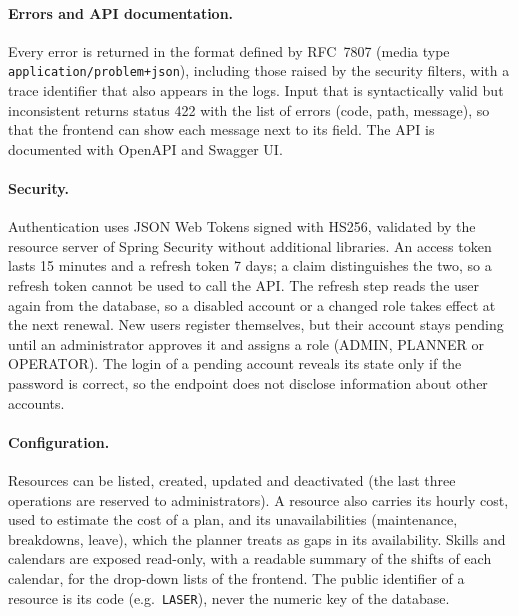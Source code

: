 \paragraph{Errors and API documentation.} Every error is returned in the format defined by
RFC~7807 (media type \texttt{application/\allowbreak problem+json}), including those raised by
the security filters, with a trace identifier that also appears in the logs. Input that is syntactically valid
but inconsistent returns status 422 with the list of errors (code, path, message), so that the
frontend can show each message next to its field. The API is documented with OpenAPI and Swagger
UI.

\paragraph{Security.} Authentication uses JSON Web Tokens signed with HS256, validated by the
resource server of Spring Security without additional libraries. An access token lasts 15
minutes and a refresh token 7 days; a claim distinguishes the two, so a refresh token cannot be
used to call the API. The refresh step reads the user again from the database, so a disabled
account or a changed role takes effect at the next renewal. New users register themselves, but
their account stays pending until an administrator approves it and assigns a role (ADMIN,
PLANNER or OPERATOR). The login of a pending account reveals its state only if the password is
correct, so the endpoint does not disclose information about other accounts.

\paragraph{Configuration.} Resources can be listed, created, updated and deactivated (the last
three operations are reserved to administrators). A resource also carries its hourly cost, used
to estimate the cost of a plan, and its unavailabilities (maintenance, breakdowns, leave), which
the planner treats as gaps in its availability. Skills and calendars are exposed read-only,
with a readable summary of the shifts of each calendar, for the drop-down lists of the frontend. The public identifier of
a resource is its code (e.g.\ \texttt{LASER}), never the numeric key of the database.

